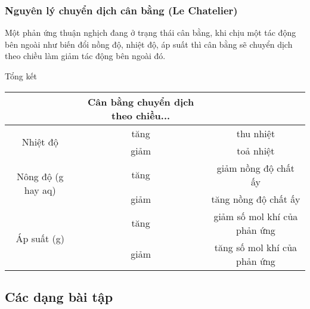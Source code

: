 \subsubsection{Nguyên lý chuyển dịch cân bằng (Le Chatelier)}
\begin{tomtat}
	Một phản ứng thuận nghịch đang ở trạng thái cân bằng, khi chịu một tác động bên ngoài như biến đổi nồng độ, nhiệt độ, áp suất thì cân bằng sẽ chuyển dịch theo chiều làm giảm tác động bên ngoài đó.
\end{tomtat}
\begin{tongket}{Tổng kết}
\begin{center}
	\begin{tabular}{|c|c|c|}
		\rowcolor{\mycolor!30} \hline \multicolumn{2}{|c|}{ \textbf{Biến đổi bên ngoài} } & \textbf{Cân bằng chuyển dịch theo chiều...} \\
		\hline \multirow{2}{*}{ Nhiệt độ } & tăng & thu nhiệt \\
		\cline { 2 - 3 } & giảm & toả nhiệt \\
		\hline \multirow{2}{*}{ Nông độ (g hay aq) } & tăng & giảm nồng độ chất ấy \\
		\cline { 2 - 3 } & giảm & tăng nồng độ chất ấy \\
		\hline \multirow{2}{*}{ Áp suất (g) } & tăng & giảm số mol khí của phản ứng \\
		\cline { 2 - 3 } & giảm & tăng số mol khí của phản ứng \\
		\hline
	\end{tabular}
\end{center}
\end{tongket}
\subsection{Các dạng bài tập}


